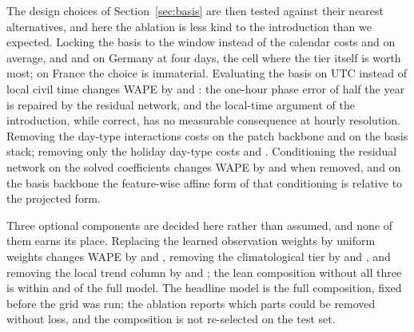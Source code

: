 The design choices of Section~\ref{sec:basis} are then tested against their nearest
alternatives, and here the ablation is less kind to the introduction than we expected. Locking
the basis to the window instead of the calendar costs 
and  on average, and
 and
 on Germany at four days, the cell where the tier
itself is worth most; on France the choice is immaterial. Evaluating the basis on UTC instead
of local civil time changes WAPE by  and
: the one-hour phase error of half the year is repaired by
the residual network, and the local-time argument of the introduction, while correct, has no
measurable consequence at hourly resolution. Removing the day-type interactions costs
 on the patch backbone and
 on the basis stack; removing only the holiday
day-type costs  and
. Conditioning the residual network on the solved
coefficients changes WAPE by  and
 when removed, and on the basis backbone the
feature-wise affine form of that conditioning is 
relative to the projected form.

Three optional components are decided here rather than assumed, and none of them earns its
place. Replacing the learned observation weights by uniform weights changes WAPE by
 and , removing
the climatological tier by  and
, and removing the local trend column by
 and ; the lean
composition without all three is within  and
 of the full model. The headline model is the full
composition, fixed before the grid was run; the ablation reports which parts could be removed
without loss, and the composition is not re-selected on the test set.

